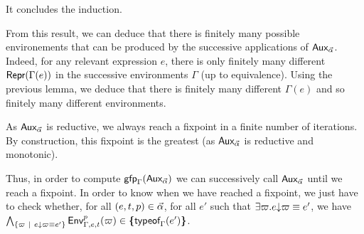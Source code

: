 \documentclass[a4paper]{article}
\theoremstyle{definition}
\begin{document}
    It concludes the induction.

    From this result, we can deduce that there is finitely many possible environements that can be produced by the successive applications of $\textsf{Aux}_{\vec \alpha}$.
    Indeed, for any relevant expression $e$, there is only finitely many different $\textsf{Repr}(\Gamma(e))$ in the successive environments $\Gamma$ (up to equivalence).
    Using the previous lemma, we deduce that there is finitely many different $\Gamma(e)$ and so finitely many different environments.

    As $\textsf{Aux}_{\vec \alpha}$ is reductive, we always reach a fixpoint in a finite number of iterations.
    By construction, this fixpoint is the greatest (as $\textsf{Aux}_{\vec \alpha}$ is reductive and monotonic).

    Thus, in order to compute $\textsf{gfp}_\Gamma (\textsf{Aux}_{\vec \alpha})$ we can successively call $\textsf{Aux}_{\vec \alpha}$ until we reach a fixpoint.
    In order to know when we have reached a fixpoint, we just have to check whether, for all $(e,t,p) \in \vec \alpha$, for all $e'$ such that
    $\exists \varpi. e{\downarrow}\varpi \equiv e'$, we have $\bigwedge_{\{\varpi ~|~ e{\downarrow}\varpi \equiv e'\}} \textsf{Env}^{p}_{\Gamma,e,t} (\varpi) \in \textbf{\textup{\{}}\textsf{typeof}_{\Gamma}(e')\textbf{\textup{\}}}$.
\end{document}
